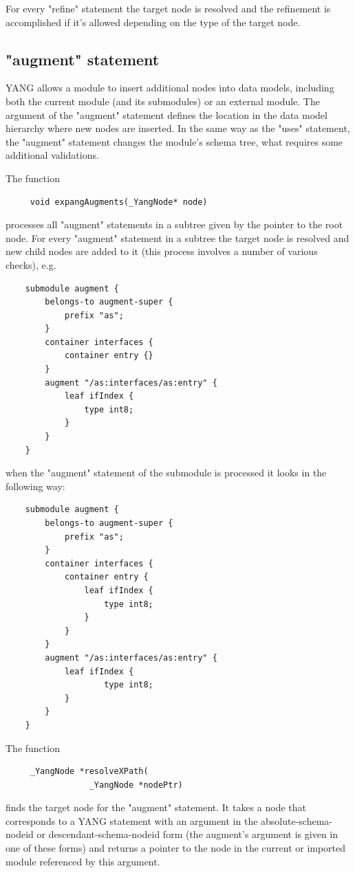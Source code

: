\documentclass[conference]{IEEEtran}
\begin{document}
For every "refine" statement the target node is resolved and the refinement is accomplished if it's allowed depending on the type of the target node.


\subsection{"augment" statement}
YANG allows a module to insert additional nodes into data models, including both the current module (and its submodules) or an external module.
The argument of the "augment" statement defines the location in the data model hierarchy where new nodes are inserted.
In the same way as the "uses" statement, the "augment" statement changes the module's schema tree, what requires some additional validations.

The function
\small
\begin{verbatim}
     void expangAugments(_YangNode* node) 
\end{verbatim}
\normalsize
processes all "augment" statements in a subtree given by the pointer to the root node. For every "augment" statement in a subtree the target node is resolved
and new child nodes are added to it (this process involves a number of various checks), e.g.
\small
\begin{verbatim}
    submodule augment {
        belongs-to augment-super {
            prefix "as";
        }
        container interfaces {
            container entry {}
        }
        augment "/as:interfaces/as:entry" {
            leaf ifIndex {
                type int8;
            }
        }
    }
\end{verbatim}
\normalsize
when the "augment" statement of the submodule is processed it looks in the following way:
\small
\begin{verbatim}
    submodule augment {
        belongs-to augment-super {
            prefix "as";
        }
        container interfaces {
            container entry {
                leaf ifIndex {
                    type int8;
                }			
            }
        }
        augment "/as:interfaces/as:entry" {
            leaf ifIndex {
                    type int8;
            }
        }
    }
\end{verbatim}
\normalsize

The function
\small
\begin{verbatim}
     _YangNode *resolveXPath(
                 _YangNode *nodePtr)
\end{verbatim}
\normalsize
finds the target node for the "augment" statement. It takes a node that corresponds to a YANG statement with an argument in the absolute-schema-nodeid or descendant-schema-nodeid form (the augment's argument is given in one of these forms)  
and returns a pointer to the node in the current or imported module referenced by this argument.
\end{document}
